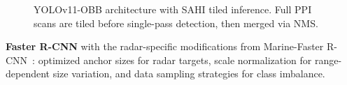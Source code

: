 \documentclass[conference]{IEEEtran}
\begin{document}
\begin{figure}[t]
\caption{YOLOv11-OBB architecture with SAHI tiled inference. Full PPI scans are tiled before single-pass detection, then merged via NMS.}
\label{fig:yolov11_arch}
\end{figure}

\textbf{Faster R-CNN} with the radar-specific modifications from Marine-Faster R-CNN~\cite{Chen2022}: optimized anchor sizes for radar targets, scale normalization for range-dependent size variation, and data sampling strategies for class imbalance.
\end{document}
